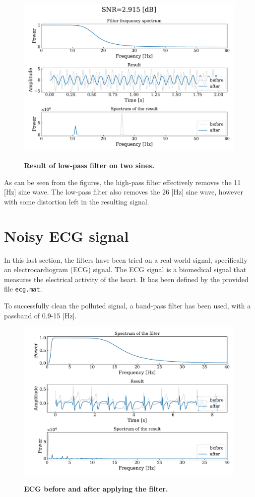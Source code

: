 \documentclass[13pt,a4paper]{article}
\begin{document}
\begin{figure}[ht!]
    \centering
    \caption{\textbf{Result of low-pass filter on two sines.}}
    \includegraphics[width=0.9\linewidth]{filter_two_sin.lowpass.pdf}
    \label{fig:filter_two_sin.lowpass}
\end{figure}

As can be seen from the figures, the high-pass filter effectively removes the 11 [Hz] sine wave. The low-pass filter also removes the 26 [Hz] sine wave, however with some distortion left in the resulting signal.

\section{Noisy ECG signal}

In this last section, the filters have been tried on a real-world signal, specifically an electrocardiogram (ECG) signal. The ECG signal is a biomedical signal that measures the electrical activity of the heart. It has been defined by the provided file \verb|ecg.mat|.

To successfully clean the polluted signal, a band-pass filter has been used, with a passband of 0.9-15 [Hz].

\begin{figure}[ht!]
    \centering
    \caption{\textbf{ECG before and after applying the filter.}}
    \includegraphics[width=0.9\linewidth]{./ecg_filter.pdf}
    \label{fig:ecg_filter}
\end{figure}
\end{document}
